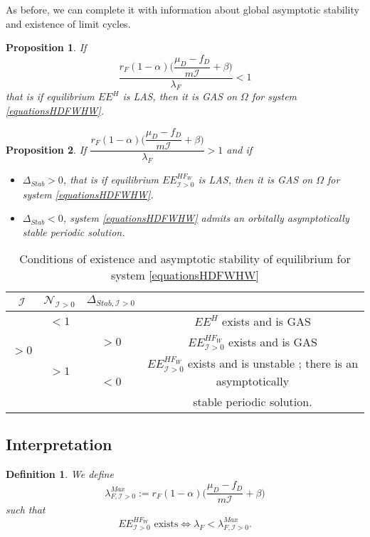 \documentclass{article}
\newcommand{\lfw}{\lambda_{F}}
\newcommand{\lfw}{\lambda_{F}}
\newcommand{\cI}{\mathcal{I}}
\newtheorem{prop}{Proposition}
\newtheorem{definition}{Definition}
\begin{document}
As before, we can complete it with information about global asymptotic stability and existence of limit cycles. 

\begin{prop}
If $$\dfrac{r_F(1-\alpha)\Big({\dfrac{\mu_D - f_D}{m\cI}+\beta\Big)}}{\lfw} < 1$$
that is if equilibrium $EE^{H}$ is LAS, then it is GAS on $\Omega$ for system \eqref{equationsHDFWHW}.
\end{prop}


\begin{prop}
If $\dfrac{r_F(1-\alpha)\Big({\dfrac{\mu_D - f_D}{m\cI}+\beta\Big)}}{\lfw} > 1$ and if 

\begin{itemize}
\item $\Delta_{Stab} > 0$, that is if equilibrium $EE^{HF_W}_{\cI >0}$ is LAS, then it is GAS on $\Omega$ for system \eqref{equationsHDFWHW}.
\item $\Delta_{Stab} < 0$, system \eqref{equationsHDFWHW} admits an orbitally asymptotically stable periodic solution.
\end{itemize}
\end{prop}



\begin{table}[!ht]
\def\arraystretch{2}
\centering
\begin{tabular}{c|c|c|c}
$\cI$ & $\mathcal{N}_{\cI > 0} $ & $\Delta_{Stab, \cI > 0}$ & \\
\hline
\multirow{3}{*}{$>0$} & $<1$ & &$EE^{H}$ exists and is GAS \\
\cline{2-4}
 & \multirow{3}{*}{$> 1$}  & $>0$ &$EE^{HF_W}_{\cI>0}$ exists and is GAS\\
 \cline{3-4}
 & & \multirow{2}{*}{$ < 0$} & $EE^{HF_W}_{\cI>0}$ exists and is unstable ; there is an asymptotically \\
 & & &  stable periodic solution. \\
\end{tabular}
\caption{\centering Conditions of existence and asymptotic stability of equilibrium for system \eqref{equationsHDFWHW}}
\end{table}

\subsection{Interpretation}

\begin{definition}
We define 
$$\lambda_{F, \cI>0}^{Max} := r_F(1-\alpha)\Big({\dfrac{\mu_D - f_D}{m\cI}+\beta\Big)}$$
such that 
$$
\text{$EE^{HF_W}_{\cI>0}$ exists} \Leftrightarrow  \lfw < \lambda_{F, \cI>0}^{Max}.
$$
\end{definition}
\end{document}

